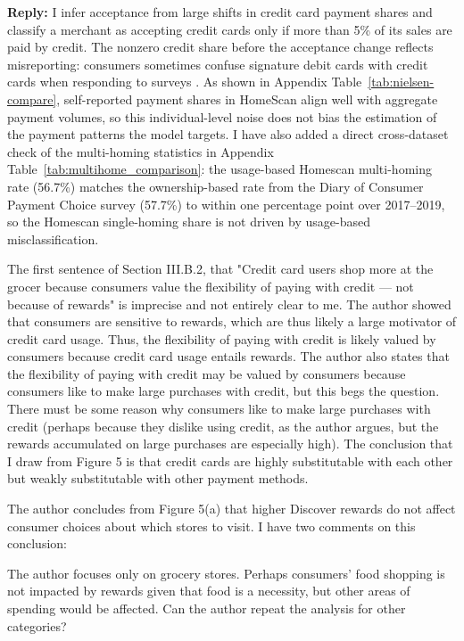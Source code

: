 \documentclass[main.tex]{subfiles}
\begin{document}
\begin{refsection}
\textbf{Reply:} I infer acceptance from large shifts in credit card payment shares and classify a merchant as accepting credit cards only if more than 5\% of its sales are paid by credit.
The nonzero credit share before the acceptance change reflects misreporting: consumers sometimes confuse signature debit cards with credit cards when responding to surveys \parencite{Rysman.etal2025}.
As shown in Appendix Table~\ref{tab:nielsen-compare}, self-reported payment shares in HomeScan align well with aggregate payment volumes, so this individual-level noise does not bias the estimation of the payment patterns the model targets.
I have also added a direct cross-dataset check of the multi-homing statistics in Appendix Table~\ref{tab:multihome_comparison}: the usage-based Homescan multi-homing rate (56.7\%) matches the ownership-based rate from the Diary of Consumer Payment Choice survey (57.7\%) to within one percentage point over 2017--2019, so the Homescan single-homing share is not driven by usage-based misclassification.

\begin{refcommentnoclear}
The first sentence of Section III.B.2, that "Credit card users shop more at the grocer because consumers value the flexibility of paying with credit --- not because of rewards" is imprecise and not entirely clear to me.
The author showed that consumers are sensitive to rewards, which are thus likely a large motivator of credit card usage.
Thus, the flexibility of paying with credit is likely valued by consumers because credit card usage entails rewards.
The author also states that the flexibility of paying with credit may be valued by consumers because consumers like to make large purchases with credit, but this begs the question.
There must be some reason why consumers like to make large purchases with credit (perhaps because they dislike using credit, as the author argues, but the rewards accumulated on large purchases are especially high).
The conclusion that I draw from Figure 5 is that credit cards are highly substitutable with each other but weakly substitutable with other payment methods.

The author concludes from Figure 5(a) that higher Discover rewards do not affect consumer choices about which stores to visit.
I have two comments on this conclusion:
\item The author focuses only on grocery stores.
Perhaps consumers' food shopping is not impacted by rewards given that food is a necessity, but other areas of spending would be affected.
Can the author repeat the analysis for other categories?


\end{refcommentnoclear}
\end{refsection}
\end{document}
